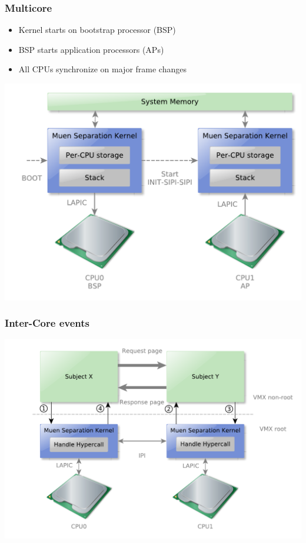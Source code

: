\documentclass[xcolor={dvipsnames}]{beamer}
\begin{document}
\begin{frame}\frametitle{Multicore}
\begin{itemize}
	\item Kernel starts on bootstrap processor (BSP)
	\item BSP starts application processors (APs)
	\item All CPUs synchronize on major frame changes
\end{itemize}
	\hspace*{0.9cm}\includegraphics[scale=0.46]{images/mp-overview.pdf}
\end{frame}

\begin{frame}\frametitle{Inter-Core events}
\begin{center}
	\includegraphics[scale=0.5]{images/inter-core-events.pdf}
\end{center}
\end{frame}
\end{document}
